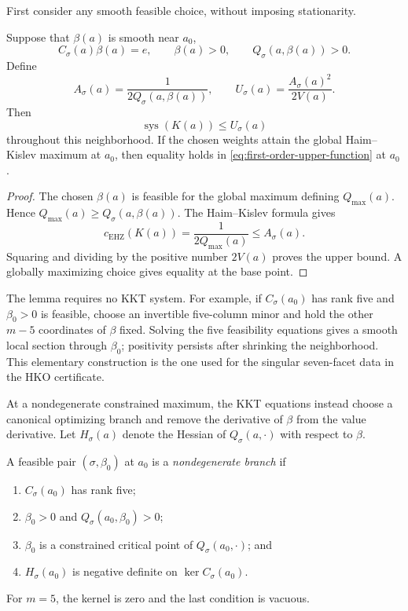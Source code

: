 First consider any smooth feasible choice, without imposing stationarity.

\begin{lemma}
\label{lem:first-order-feasible-section-upper-function}
Suppose that \(\beta(a)\) is smooth near \(a_0\),
\[
  C_\sigma(a)\beta(a)=e,
  \qquad \beta(a)>0,
  \qquad Q_\sigma(a,\beta(a))>0.
\]
Define
\[
  A_\sigma(a)=\frac{1}{2Q_\sigma(a,\beta(a))},
  \qquad
  U_\sigma(a)=\frac{A_\sigma(a)^2}{2V(a)}.
\]
Then
\begin{equation}\label{eq:first-order-upper-function}
  \operatorname{sys}(K(a))\leq U_\sigma(a)
\end{equation}
throughout this neighborhood.  If the chosen weights attain the global
Haim--Kislev maximum at \(a_0\), then equality holds in
\eqref{eq:first-order-upper-function} at \(a_0\).
\end{lemma}

\begin{proof}
The chosen \(\beta(a)\) is feasible for the global maximum defining
\(Q_{\max}(a)\).  Hence
\(Q_{\max}(a)\geq Q_\sigma(a,\beta(a))\).  The Haim--Kislev formula gives
\[
  c_{\mathrm{EHZ}}(K(a))
  =\frac{1}{2Q_{\max}(a)}
  \leq A_\sigma(a).
\]
Squaring and dividing by the positive number \(2V(a)\) proves the upper
bound.  A globally maximizing choice gives equality at the base point.
\end{proof}

The lemma requires no KKT system.  For example, if
\(C_\sigma(a_0)\) has rank five and \(\beta_0>0\) is feasible, choose an
invertible five-column minor and hold the other \(m-5\) coordinates of
\(\beta\) fixed.  Solving the five feasibility equations gives a smooth local
section through \(\beta_0\); positivity persists after shrinking the
neighborhood.  This elementary construction is the one used for the singular
seven-facet data in the HKO certificate.

At a nondegenerate constrained maximum, the KKT equations instead choose a canonical
optimizing branch and remove the derivative of \(\beta\) from the value
derivative.  Let \(H_\sigma(a)\) denote the Hessian of
\(Q_\sigma(a,\cdot)\) with respect to \(\beta\).

\begin{definition}
\label{def:first-order-regular-hk-branch}
A feasible pair \((\sigma,\beta_0)\) at \(a_0\) is a \emph{nondegenerate branch}
if
\begin{enumerate}
\item \(C_\sigma(a_0)\) has rank five;
\item \(\beta_0>0\) and \(Q_\sigma(a_0,\beta_0)>0\);
\item \(\beta_0\) is a constrained critical point of
  \(Q_\sigma(a_0,\cdot)\); and
\item \(H_\sigma(a_0)\) is negative definite on
  \(\ker C_\sigma(a_0)\).
\end{enumerate}
For \(m=5\), the kernel is zero and the last condition is vacuous.
\end{definition}

